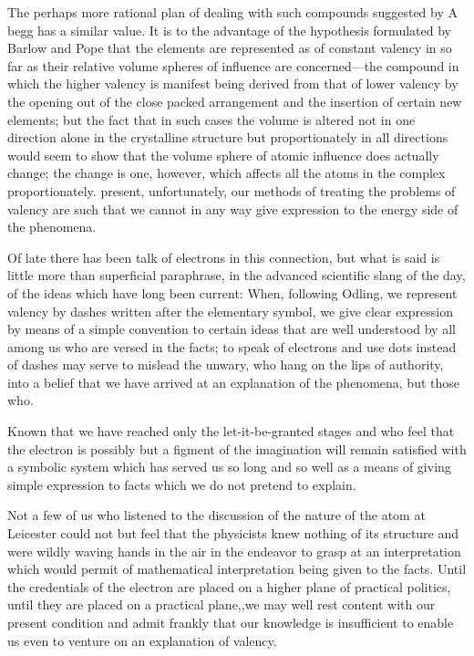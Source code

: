\documentclass{article}
\newcommand{\CommonElementTextFormat}[4]
{
  \begin{minipage}{2.2cm}
    \centering
      {\textbf{#1} \hfill #2}%
      \linebreak \linebreak
      {\textbf{#3}}%
      \linebreak \linebreak
      {{#4}}
  \end{minipage}
}
\newcommand{\NaturalElementTextFormat}[4]
{
  \CommonElementTextFormat{#1}{#2}{\LARGE {#3}}{#4}
}
\def\centerfigure#1{%
  \setbox\mybox\hbox{#1}%
  \raisebox{-0.43\dimexpr\ht\mybox+\dp\mybox}{\copy\mybox}%
}
\begin{document}
The perhaps more rational plan of dealing with such compounds suggested by A begg has a similar value. It is to the advantage of the hypothesis formulated by Barlow and Pope that the elements are represented as of constant valency in so far as their relative volume spheres of influence are concerned—the compound in which the higher valency is manifest being derived from that of lower valency by the opening out of the close packed arrangement and the insertion of certain new elements; but the fact that in such cases the volume is altered not in one direction alone in the crystalline structure but proportionately in all directions would seem to show that the volume sphere of atomic influence does actually change; the change is one, however, which affects all the atoms in the complex proportionately. \scalebox{0.3}{
  \centerfigure{\begin{tikzpicture}[font=\sffamily, transform shape]
    \node[name=At, Metalloid, rounded corners=.15cm, node distance=3cm] {\hyperlink{subsubsection::At}{\NaturalElementTextFormat{85}{210.0}{At}{Astatine}}};
  \end{tikzpicture}}
} present, unfortunately, our methods of treating the problems of valency are such that we cannot in any way give expression to the energy side of the phenomena. 

Of late there has been talk of electrons in this connection, but what is said is little more than superficial paraphrase, in the advanced scientific slang of the day, of the ideas which have long been current: When, following Odling, we represent valency by dashes written after the elementary symbol, we give clear expression by means of a simple convention to certain ideas that are well understood by all among us who are versed in the facts; to speak of electrons and use dots instead of dashes may serve to mislead the unwary, who hang on the lips of authority, into a belief that we have arrived at an explanation of the phenomena, but those who. 

Known that we have reached only the let-it-be-granted stages and who feel that the electron is possibly but a figment of the imagination will remain satisfied with a symbolic system which has served us so long and so well as a means of giving simple expression to facts which we do not pretend to explain. 

Not a few of us who listened to the discussion of the nature of the atom at Leicester could not but feel that the physicists knew nothing of its structure and were wildly waving hands in the air in the endeavor to grasp at an interpretation which would permit of mathematical interpretation being given to the facts. Until the credentials of the electron are placed on a higher plane of practical politics, until they are placed on a practical plane,,we may well rest content with our present condition and admit frankly that our knowledge is insufficient to enable us even to venture on an explanation of valency. 
\end{document}
